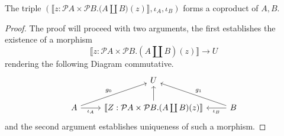 \documentclass{tac}
\newcommand{\call}[1]{\mathcal{#1}}
\newcommand{\lto}{\longrightarrow}
\begin{document}
	\begin{proposition}\label{prop:coproduct}
		The triple $(\llbracket z: \call{P}A \times \call{P}B . \big(A \coprod B\big)(z) \rrbracket, \iota_A, \iota_B)$ forms a coproduct of $A,B$.
	\end{proposition}
	\begin{proof}
		The proof will proceed with two arguments, the first establishes the existence of a morphism
		\begin{equation}
			\llbracket z : \call{P}A \times \call{P}B . (A \coprod B)(z)\rrbracket \lto U
		\end{equation}
		rendering the following Diagram commutative.
		\begin{equation}\label{eq:standard_coprod_diag}
			\begin{tikzcd}
				& U\\
				A\arrow[ur,"{g_0}"]\arrow[r,swap,"{\iota_A}"] & \llbracket Z : \call{P}A \times \call{P}B . (A \coprod B)(z)\rrbracket\arrow[u] & B\arrow[ul,swap,"g_1"]\arrow[l,"{\iota_B}"]
			\end{tikzcd}
		\end{equation}
		and the second argument establishes uniqueness of such a morphism.
		

\end{proof}
\end{document}
